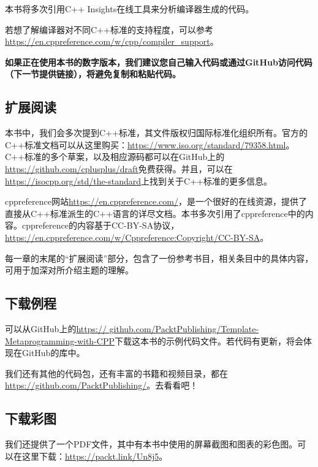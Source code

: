 本书将多次引用C++ Insights在线工具来分析编译器生成的代码。

若想了解编译器对不同C++标准的支持程度，可以参考\url{https://en.cppreference.com/w/cpp/compiler\_support}。

\textbf{
如果正在使用本书的数字版本，我们建议您自己输入代码或通过GitHub访问代码（下一节提供链接），将避免复制和粘贴代码。
}

\subsection{扩展阅读}

本书中，我们会多次提到C++标准，其文件版权归国际标准化组织所有。官方的C++标准文档可以从这里购买：\url{https://www.iso.org/standard/79358.html}。C++标准的多个草案，以及相应源码都可以在GitHub上的\url{https://github.com/cplusplus/draft}免费获得。并且，可以在\url{https://isocpp.org/std/the-standard}上找到关于C++标准的更多信息。

cppreference网站\url{https://en.cppreference.com/}，是一个很好的在线资源，提供了直接从C++标准派生的C++语言的详尽文档。本书多次引用了cppreference中的内容。cppreference的内容基于CC-BY-SA协议，\url{https://en.cppreference.com/w/Cppreference:Copyright/CC-BY-SA}。

每一章的末尾的“扩展阅读”部分，包含了一份参考书目，相关条目中的具体内容，可用于加深对所介绍主题的理解。

\subsection{下载例程}

可以从GitHub上的\url{https:// github.com/PacktPublishing/Template-Metaprogramming-with-CPP}下载这本书的示例代码文件。若代码有更新，将会体现在GitHub的库中。

我们还有其他的代码包，还有丰富的书籍和视频目录，都在\url{https://github.com/PacktPublishing/}。去看看吧！

\subsection{下载彩图}

我们还提供了一个PDF文件，其中有本书中使用的屏幕截图和图表的彩色图。可以在这里下载：\url{https://packt.link/Un8j5}。








